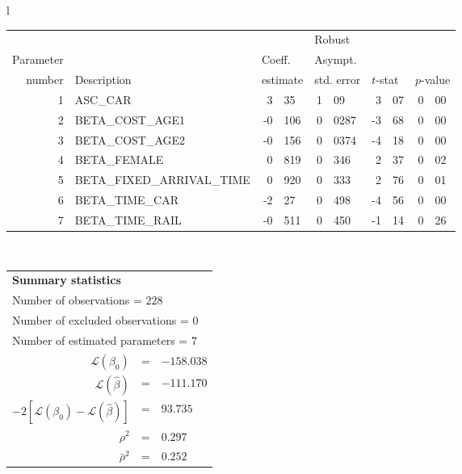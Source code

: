   \begin{tabular}{l}
\begin{tabular}{rlr@{.}lr@{.}lr@{.}lr@{.}l}
         &                       &   \multicolumn{2}{l}{}    & \multicolumn{2}{l}{Robust}  &     \multicolumn{4}{l}{}   \\
Parameter &                       &   \multicolumn{2}{l}{Coeff.}      & \multicolumn{2}{l}{Asympt.}  &     \multicolumn{4}{l}{}   \\
number &  Description                     &   \multicolumn{2}{l}{estimate}      & \multicolumn{2}{l}{std. error}  &   \multicolumn{2}{l}{$t$-stat}  &   \multicolumn{2}{l}{$p$-value}   \\

\hline

1 & ASC_CAR & 3&35 & 1&09 & 3&07 & 0&00\\
2 & BETA_COST_AGE1 & -0&106 & 0&0287 & -3&68 & 0&00\\
3 & BETA_COST_AGE2 & -0&156 & 0&0374 & -4&18 & 0&00\\
4 & BETA_FEMALE & 0&819 & 0&346 & 2&37 & 0&02\\
5 & BETA_FIXED_ARRIVAL_TIME & 0&920 & 0&333 & 2&76 & 0&01\\
6 & BETA_TIME_CAR & -2&27 & 0&498 & -4&56 & 0&00\\
7 & BETA_TIME_RAIL & -0&511 & 0&450 & -1&14 & 0&26\\
\hline
\end{tabular}
\\
\begin{tabular}{rcl}
\multicolumn{3}{l}{\bf Summary statistics}\\
\multicolumn{3}{l}{ Number of observations = $228$} \\
\multicolumn{3}{l}{ Number of excluded observations = $0$} \\
\multicolumn{3}{l}{ Number of estimated  parameters = $7$} \\
 $\mathcal{L}(\beta_0)$ &=&  $-158.038$ \\
 $\mathcal{L}(\hat{\beta})$ &=& $-111.170 $  \\
 $-2[\mathcal{L}(\beta_0) -\mathcal{L}(\hat{\beta})]$ &=& $93.735$ \\
    $\rho^2$ &=&   $0.297$ \\
    $\bar{\rho}^2$ &=&    $0.252$ \\
\end{tabular}
  \end{tabular}
